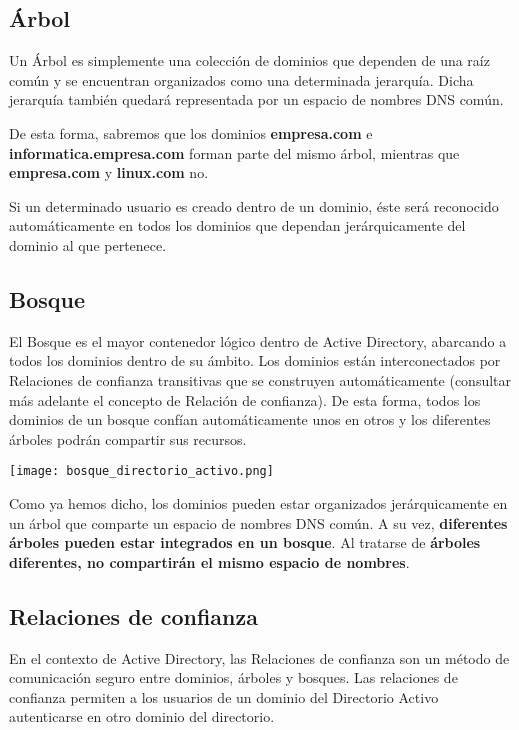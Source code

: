 \subsection{Árbol}
Un Árbol es simplemente una colección de dominios que dependen de una raíz común y se encuentran organizados como una determinada jerarquía. Dicha jerarquía también quedará representada por un espacio de nombres DNS común.

De esta forma, sabremos que los dominios \textbf{empresa.com} e \textbf{informatica.empresa.com} forman parte del mismo árbol, mientras que \textbf{empresa.com} y \textbf{linux.com} no.

Si un determinado usuario es creado dentro de un dominio, éste será reconocido automáticamente en todos los dominios que dependan jerárquicamente del dominio al que pertenece.


\subsection{Bosque}
El Bosque es el mayor contenedor lógico dentro de Active Directory, abarcando a todos los dominios dentro de su ámbito. Los dominios están interconectados por Relaciones de confianza transitivas que se construyen automáticamente (consultar más adelante el concepto de Relación de confianza). De esta forma, todos los dominios de un bosque confían automáticamente unos en otros y los diferentes árboles podrán compartir sus recursos.

\begin{center}
    \vspace{-15pt}
    \texttt{[image: bosque\_directorio\_activo.png]}
    \vspace{-15pt}
\end{center}

Como ya hemos dicho, los dominios pueden estar organizados jerárquicamente en un árbol que comparte un espacio de nombres DNS común. A su vez, \textbf{diferentes árboles pueden estar integrados en un bosque}. Al tratarse de \textbf{árboles diferentes, no compartirán el mismo espacio de nombres}.

\subsection{Relaciones de confianza}
En el contexto de Active Directory, las Relaciones de confianza son un método de comunicación seguro entre dominios, árboles y bosques. Las relaciones de confianza permiten a los usuarios de un dominio del Directorio Activo autenticarse en otro dominio del directorio.


